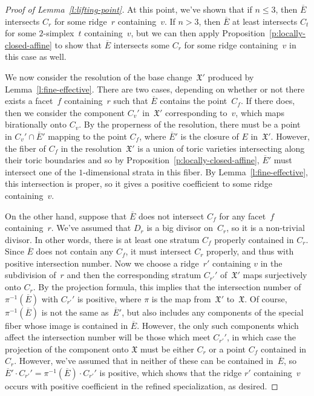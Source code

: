 \documentclass[11pt]{amsart}
\theoremstyle{definition}
\newcommand{\X}{\mathfrak X}
\begin{document}
\begin{proof}[Proof of Lemma~\ref{l:lifting-point}]
At this point, we've shown that if $n \leq 3$, then $\overline E$ intersects
$C_r$ for some ridge~$r$ containing~$v$. If $n > 3$, then $\overline E$ at least
intersects $C_t$ for some $2$-simplex~$t$ containing~$v$, but we can then apply
Proposition~\ref{p:locally-closed-affine} to show that $\overline E$
intersects some $C_r$ for some ridge containing~$v$ in this case as well.

We now consider the resolution of the base change~$\X'$ produced by
Lemma~\ref{l:fine-effective}. There are two cases, depending on whether or not
there exists a facet~$f$ containing~$r$ such that $\overline E$ contains the
point~$C_f$. If there does, then we consider the component $C_v'$ in~$\X'$
corresponding to~$v$, which maps birationally onto $C_v$. By the properness of
the resolution, there must be a point in $C_v' \cap \overline E'$ mapping to the
point $C_f$, where $\overline E'$ is the closure of $E$ in~$\X'$. However, the
fiber of $C_f$ in the resolution~$\X'$ is a union of toric varieties
intersecting along their toric boundaries and so by
Proposition~\ref{p:locally-closed-affine}, $\overline E'$ must intersect one
of the $1$-dimensional strata in this fiber. By Lemma~\ref{l:fine-effective},
this intersection is proper, so it gives a positive coefficient to some ridge
containing~$v$.

On the other hand, suppose that $\overline E$ does not intersect $C_f$ for
any facet~$f$ containing~$r$. We've assumed that $D_r$ is a big divisor
on~$C_r$, so it is a non-trivial divisor. In other words, there is at least one
stratum $C_f$ properly contained in $C_r$. Since $\overline E$ does not
contain any $C_f$, it must intersect $C_r$ properly, and thus
with positive intersection number. Now we choose a ridge~$r'$ containing $v$ in
the subdivision of~$r$ and then the corresponding stratum $C_{r'}'$ of~$\X'$
maps surjectively onto $C_r$. By the projection formula, this implies that the
intersection number of $\pi^{-1}(\overline E)$ with $C_{r'}'$ is positive, where
$\pi$ is the map from~$\X'$ to~$\X$. Of course, $\pi^{-1}(\overline E)$ is not
the same as~$\overline E'$, but also includes any
components of the special fiber whose image is contained in $\overline E$.
However, the only such components which affect the intersection number will be
those which meet $C_{r'}'$, in which case the projection of the component onto
$\X$ must be either $C_r$ or a point $C_f$ contained in $C_r$. However, we've
assumed that in neither of these can be contained in~$\overline E$, so
$\overline E' \cdot C_{r'}' = \pi^{-1}(\overline E) \cdot C_{r'}'$ is positive,
which shows that the ridge $r'$ containing~$v$ occurs with positive coefficient
in the refined specialization, as desired.
\end{proof}
\end{document}
